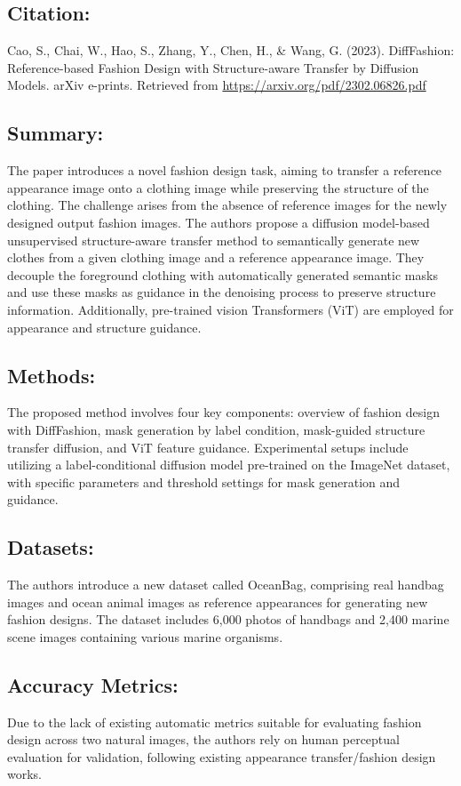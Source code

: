 \documentclass{article}
\begin{document}
\subsection*{Citation:}
Cao, S., Chai, W., Hao, S., Zhang, Y., Chen, H., \& Wang, G. (2023). DiffFashion: Reference-based Fashion Design with Structure-aware Transfer by Diffusion Models. arXiv e-prints. Retrieved from \url{https://arxiv.org/pdf/2302.06826.pdf}

\subsection*{Summary:}
The paper introduces a novel fashion design task, aiming to transfer a reference appearance image onto a clothing image while preserving the structure of the clothing. The challenge arises from the absence of reference images for the newly designed output fashion images. The authors propose a diffusion model-based unsupervised structure-aware transfer method to semantically generate new clothes from a given clothing image and a reference appearance image. They decouple the foreground clothing with automatically generated semantic masks and use these masks as guidance in the denoising process to preserve structure information. Additionally, pre-trained vision Transformers (ViT) are employed for appearance and structure guidance.

\subsection*{Methods:}
The proposed method involves four key components: overview of fashion design with DiffFashion, mask generation by label condition, mask-guided structure transfer diffusion, and ViT feature guidance. Experimental setups include utilizing a label-conditional diffusion model pre-trained on the ImageNet dataset, with specific parameters and threshold settings for mask generation and guidance.

\subsection*{Datasets:}
The authors introduce a new dataset called OceanBag, comprising real handbag images and ocean animal images as reference appearances for generating new fashion designs. The dataset includes 6,000 photos of handbags and 2,400 marine scene images containing various marine organisms.

\subsection*{Accuracy Metrics:}
Due to the lack of existing automatic metrics suitable for evaluating fashion design across two natural images, the authors rely on human perceptual evaluation for validation, following existing appearance transfer/fashion design works.
\end{document}
